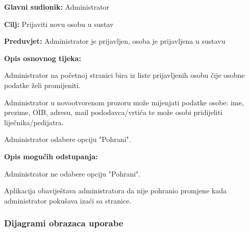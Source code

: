 					\noindent {}
					\begin{packed_item}
						
						\item \textbf{Glavni sudionik: }Administrator
						\item  \textbf{Cilj:} Prijaviti novu osobu u sustav
						\item  \textbf{Preduvjet:} Administrator je prijavljen, osoba je prijavljena u sustavu
						\item  \textbf{Opis osnovnog tijeka:}
						
						\item[] \begin{packed_enum}
							
							\item Administrator na početnoj stranici bira iz liste prijavljenih osobu čije osobne podatke želi promijeniti.
							\item Administrator u novootvorenom prozoru može mijenjati podatke osobe: ime, prezime, OIB, adresu, mail poslodavca/vrtića te može osobi pridijeliti liječnika/pedijatra.
							\item Administrator odabere opciju "Pohrani".
						\end{packed_enum}
						
						\item  \textbf{Opis mogućih odstupanja:}
						
						\item[] \begin{packed_item}
							
							\item[3.a] Administrator ne odabere opciju "Pohrani".
							\item[] \begin{packed_enum}
								
								\item Aplikacija obaviještava administratora da nije pohranio promjene kada administrator pokušava izaći sa stranice.
							\end{packed_enum}
							
							
						\end{packed_item}
						
						
					\end{packed_item}
					
					
				
					
				\subsubsection{Dijagrami obrazaca uporabe}
					
